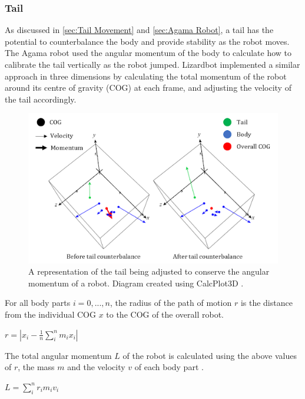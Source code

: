 \documentclass{article}
\begin{document}
\newpage
\subsubsection{Tail}
\label{sec:Tail Imp}
As discussed in \ref{sec:Tail Movement} and \ref{sec:Agama Robot}, a tail has the potential to counterbalance the body and provide stability as the robot moves. The Agama robot used the angular momentum of the body to calculate how to calibrate the tail vertically as the robot jumped. Lizardbot implemented a similar approach in three dimensions by calculating the total momentum of the robot around its centre of gravity (COG) at each frame, and adjusting the velocity of the tail accordingly.\\ 
\begin{figure}[H]
\centering
\includegraphics[scale=0.6]{tailMomentum}
\caption{A representation of the tail being adjusted to conserve the angular momentum of a robot. Diagram created using CalcPlot3D \citep{diagrams}.}
\end{figure}

\noindent For all body parts $i = 0, ..., n$, the radius of the path of motion $r$ is the distance from the individual COG $x$ to the COG of the overall robot.
\begin{center}
\begin{Large}
$r = |x_{i} - \frac{1}{n}\sum_{i}^{n}m_{i}x_{i}|$
\end{Large}
\end{center}

\noindent The total angular momentum $L$ of the robot is calculated using the above values of $r$, the mass $m$ and the velocity $v$ of each body part .
\begin{center}
\begin{Large}
$L = \sum^{n}_{i} r_{i}m_{i}v_{i}$
\end{Large}
\end{center}
\end{document}
